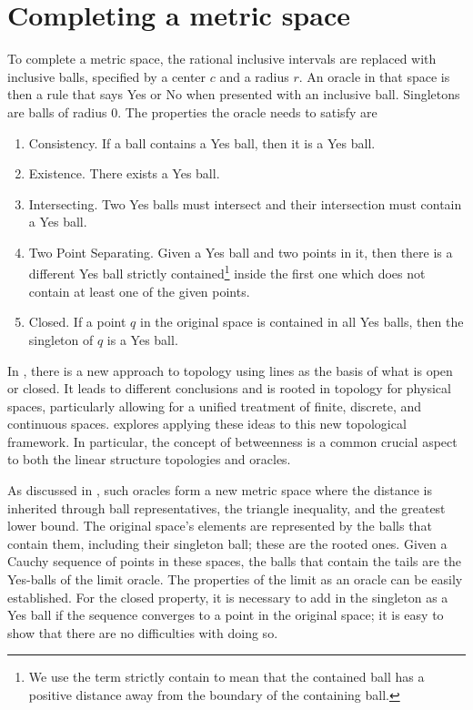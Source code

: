 \documentclass[12pt]{article}
\begin{document}
\section{Completing a metric space}

To complete a metric space, the rational inclusive intervals are replaced with inclusive balls, specified by a center $c$ and a radius $r$. An oracle in that space is then a rule that says Yes or No when presented with an inclusive ball. Singletons are balls of radius $0$. The properties the oracle needs to satisfy are
\begin{enumerate}
    \item Consistency. If a ball contains a Yes ball, then it is a Yes ball. 
    \item Existence. There exists a Yes ball.
    \item Intersecting. Two Yes balls must intersect and their intersection must contain a Yes ball.
    \item Two Point Separating. Given a Yes ball and two points in it, then there is a different Yes ball strictly contained\footnote{We use the term strictly contain to mean that the contained ball has a positive distance away from the boundary of the containing ball.} inside the first one which does not contain at least one of the given points. 
    \item Closed. If a point $q$ in the original space is contained in all Yes balls, then the singleton of $q$ is a Yes ball.
\end{enumerate}

In \cite{maudlin}, there is a new approach to topology using lines as the basis of what is open or closed. It leads to different conclusions and is rooted in topology for physical spaces, particularly allowing for a unified treatment of finite, discrete, and continuous spaces. \cite{taylor23maudlin} explores applying these ideas to this new topological framework. In particular, the concept of betweenness is a common crucial aspect to both the linear structure topologies and oracles. 

As discussed in \cite{taylor23metric}, such oracles form a new metric space where the distance is inherited through ball representatives, the triangle inequality, and the greatest lower bound. The original space's elements are represented by the balls that contain them, including their singleton ball; these are the rooted ones. Given a Cauchy sequence of points in these spaces, the balls that contain the tails are the Yes-balls of the limit oracle. The properties of the limit as an oracle can be easily established. For the closed property, it is necessary to add in the singleton as a Yes ball if the sequence converges to a point in the original space; it is easy to show that there are no difficulties with doing so. 
\end{document}
